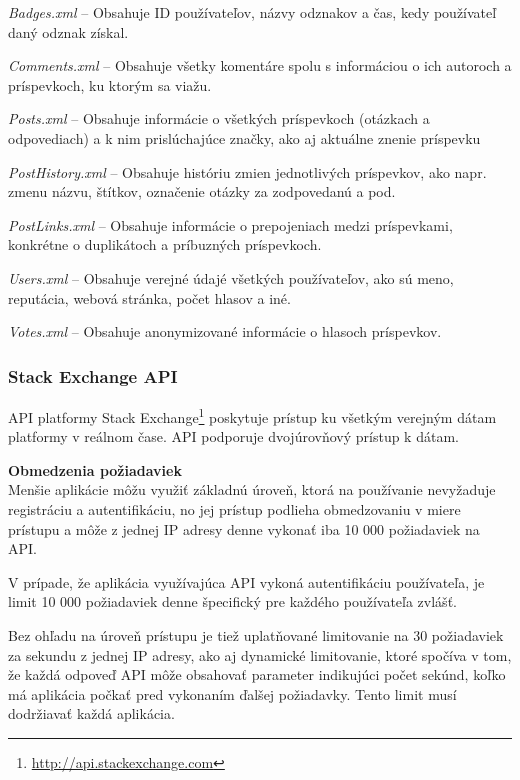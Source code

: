 \begin{my_itemize}
  \item{\textit{Badges.xml} -- Obsahuje ID používateľov, názvy odznakov a čas, kedy používateľ daný odznak získal.}
  \item{\textit{Comments.xml} -- Obsahuje všetky komentáre spolu s informáciou o ich autoroch a príspevkoch, ku ktorým sa viažu.}
  \item{\textit{Posts.xml} -- Obsahuje informácie o všetkých príspevkoch (otázkach a odpovediach) a k nim prislúchajúce značky, ako aj aktuálne znenie príspevku}
  \item{\textit{PostHistory.xml} -- Obsahuje históriu zmien jednotlivých príspevkov, ako napr. zmenu názvu, štítkov, označenie otázky za zodpovedanú a pod.}
  \item{\textit{PostLinks.xml} -- Obsahuje informácie o prepojeniach medzi príspevkami, konkrétne o duplikátoch a príbuzných príspevkoch.}
  \item{\textit{Users.xml} -- Obsahuje verejné údajé všetkých používateľov, ako sú meno, reputácia, webová stránka, počet hlasov a iné.}
  \item{\textit{Votes.xml} -- Obsahuje anonymizované informácie o hlasoch príspevkov.}
\end{my_itemize}


\subsubsection{Stack Exchange API}

API platformy Stack Exchange\footnote{\url{http://api.stackexchange.com}} poskytuje prístup ku všetkým verejným dátam
platformy v reálnom čase. API podporuje dvojúrovňový prístup k dátam.

\textbf{Obmedzenia požiadaviek}\\
Menšie aplikácie môžu využiť základnú úroveň, ktorá na používanie nevyžaduje registráciu a autentifikáciu,
no jej prístup podlieha obmedzovaniu v miere prístupu a môže z jednej IP adresy denne vykonať iba 10 000 požiadaviek na API.

V prípade, že aplikácia využívajúca API vykoná autentifikáciu používateľa, je limit 10 000 požiadaviek denne špecifický
pre každého používateľa zvlášť.

Bez ohľadu na úroveň prístupu je tiež uplatňované limitovanie na 30 požiadaviek za sekundu z jednej IP adresy, ako aj
dynamické limitovanie, ktoré spočíva v tom, že každá odpoveď API môže obsahovať parameter indikujúci počet sekúnd, koľko
má aplikácia počkať pred vykonaním ďalšej požiadavky. Tento limit musí dodržiavať každá aplikácia.

